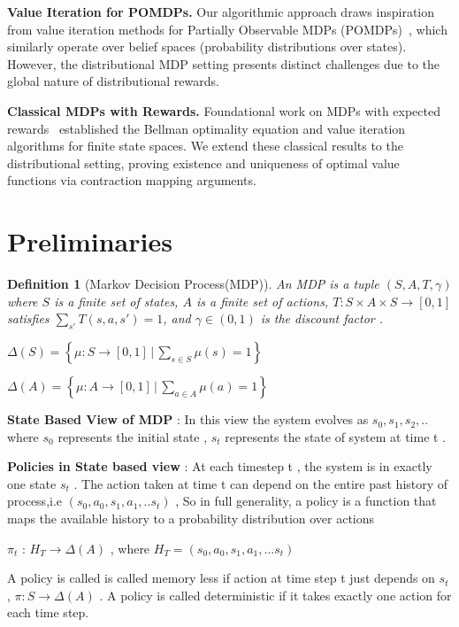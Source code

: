 \documentclass{article}
\newcommand{\ak}[1]{\textcolor{red}{ak: #1}}
\newtheorem{definition}{Definition}
\begin{document}
\textbf{Value Iteration for POMDPs.} Our algorithmic approach draws inspiration from value iteration methods for Partially Observable MDPs (POMDPs)~\citep{smallwood1973optimal, Krishnamurthy_2016}, which similarly operate over belief spaces (probability distributions over states). However, the distributional MDP setting presents distinct challenges due to the global nature of distributional rewards.

\textbf{Classical MDPs with Rewards.} Foundational work on MDPs with expected rewards~\citep{puterman1994markov, bertsekas1995dynamic} established the Bellman optimality equation and value iteration algorithms for finite state spaces. We extend these classical results to the distributional setting, proving existence and uniqueness of optimal value functions via contraction mapping arguments.


\section{Preliminaries}\label{sec:prelim}

\begin{definition}[Markov Decision Process(MDP)]
An MDP is a tuple $(S, A, T, \gamma)$ where $S$ is a finite set of states, $A$ is a finite set of actions, $T: S \times A \times S \to [0,1]$ satisfies $\sum_{s'} T(s,a,s') = 1$, and $\gamma \in (0,1)$ is the discount factor .
\end{definition}
    
$\Delta(S) = \left\{ \mu: S \to [0,1] \,\Big|\, \sum_{s \in S} \mu(s) = 1 \right\}$ 


$\Delta(A) = \left\{ \mu: A \to [0,1] \,\Big|\, \sum_{a \in A} \mu(a) = 1 \right\}$

\textbf{State Based View of MDP} : In this view the system evolves as $s_0,s_1,s_2,.. $ where $s_0$ represents the initial state , $s_t$ represents the state of system at time t .

\textbf{Policies in State based view} : At each timestep t , the system is in exactly one state $s_t$ . The action taken at time t can depend on the entire past history of process,i.e $(s_0,a_0,s_1,a_1,..s_t)$ ,
So in full generality, a policy is a function that maps the available history to a probability distribution over actions 

 $\pi_t$ : $H_T \to \Delta(A) $ , where $H_T = (s_0,a_0,s_1,a_1,...s_t) $

A policy is called is called memory less if action at time step t just depends on $s_t$ , $\pi:S \to \Delta(A) $ . A policy is called deterministic if it takes exactly one action for each time step.
\end{document}
